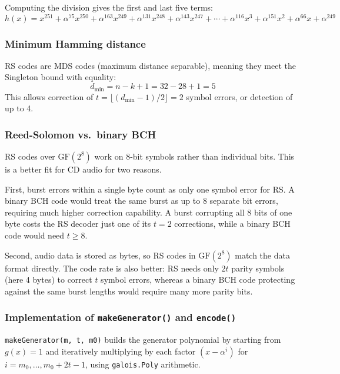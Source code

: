 \documentclass[11pt,a4paper]{article}
\begin{document}
Computing the division gives the first and last five terms:
\[
h(x) = x^{251} + \alpha^{75}x^{250} + \alpha^{163}x^{249} + \alpha^{131}x^{248} + \alpha^{143}x^{247} + \cdots + \alpha^{116}x^3 + \alpha^{151}x^2 + \alpha^{66}x + \alpha^{249}
\]

\subsubsection{Minimum Hamming distance}

RS codes are MDS codes (maximum distance separable), meaning they meet the Singleton bound with equality:
\[
d_{\min} = n - k + 1 = 32 - 28 + 1 = 5
\]
This allows correction of $t = \lfloor(d_{\min}-1)/2\rfloor = 2$ symbol errors, or detection of up to 4.

\subsubsection{Reed-Solomon vs.\ binary BCH}

RS codes over $\text{GF}(2^8)$ work on 8-bit symbols rather than individual bits. This is a better fit for CD audio for two reasons.

First, burst errors within a single byte count as only one symbol error for RS. A binary BCH code would treat the same burst as up to 8 separate bit errors, requiring much higher correction capability. A burst corrupting all 8 bits of one byte costs the RS decoder just one of its $t=2$ corrections, while a binary BCH code would need $t \geq 8$.

Second, audio data is stored as bytes, so RS codes in $\text{GF}(2^8)$ match the data format directly. The code rate is also better: RS needs only $2t$ parity symbols (here 4 bytes) to correct $t$ symbol errors, whereas a binary BCH code protecting against the same burst lengths would require many more parity bits.

\subsubsection{Implementation of \texttt{makeGenerator()} and \texttt{encode()}}

\texttt{makeGenerator(m, t, m0)} builds the generator polynomial by starting from $g(x) = 1$ and iteratively multiplying by each factor $(x - \alpha^i)$ for $i = m_0, \ldots, m_0+2t-1$, using \texttt{galois.Poly} arithmetic.
\end{document}
